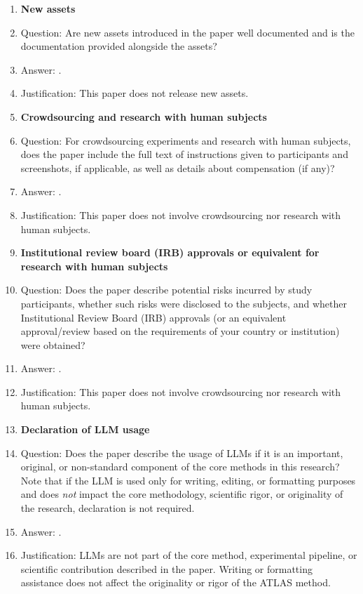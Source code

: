 \begin{enumerate}
\item {\bf New assets}
    \item[] Question: Are new assets introduced in the paper well documented and is the documentation provided alongside the assets?
    \item[] Answer: \answerNA{}.
    \item[] Justification: This paper does not release new assets.

\item {\bf Crowdsourcing and research with human subjects}
    \item[] Question: For crowdsourcing experiments and research with human subjects, does the paper include the full text of instructions given to participants and screenshots, if applicable, as well as details about compensation (if any)?
    \item[] Answer: \answerNA{}.
    \item[] Justification: This paper does not involve crowdsourcing nor research with human subjects.

\item {\bf Institutional review board (IRB) approvals or equivalent for research with human subjects}
    \item[] Question: Does the paper describe potential risks incurred by study participants, whether such risks were disclosed to the subjects, and whether Institutional Review Board (IRB) approvals (or an equivalent approval/review based on the requirements of your country or institution) were obtained?
    \item[] Answer: \answerNA{}.
    \item[] Justification: This paper does not involve crowdsourcing nor research with human subjects.

\item {\bf Declaration of LLM usage}
    \item[] Question: Does the paper describe the usage of LLMs if it is an important, original, or non-standard component of the core methods in this research? Note that if the LLM is used only for writing, editing, or formatting purposes and does \emph{not} impact the core methodology, scientific rigor, or originality of the research, declaration is not required.
    \item[] Answer: \answerNA{}.
    \item[] Justification: LLMs are not part of the core method, experimental pipeline, or scientific contribution described in the paper. Writing or formatting assistance does not affect the originality or rigor of the ATLAS method.

\end{enumerate}

